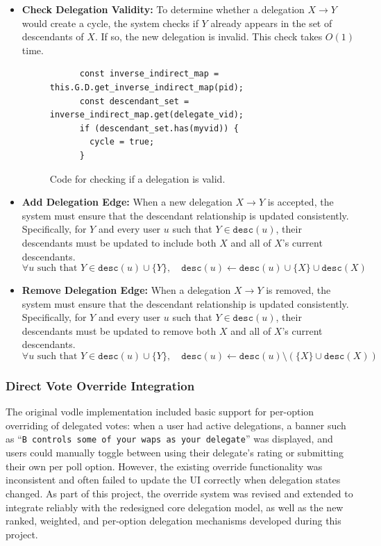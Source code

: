 \begin{itemize}
  \item \textbf{Check Delegation Validity:} To determine whether a delegation \(X \!\to\! Y\) would create a cycle, the system checks if \(Y\) already appears in the set of descendants of \(X\). If so, the new delegation is invalid. This check takes \(O(1)\) time.
  \begin{figure}[H]
    \centering
    \begin{verbatim}
      const inverse_indirect_map = this.G.D.get_inverse_indirect_map(pid);
      const descendant_set = inverse_indirect_map.get(delegate_vid);
      if (descendant_set.has(myvid)) {
        cycle = true;
      }
    \end{verbatim}
    \caption{Code for checking if a delegation is valid.}
  \end{figure}

  \item \textbf{Add Delegation Edge:} When a new delegation \(X \to Y\) is accepted, the system must ensure that the descendant relationship is updated consistently. Specifically, for $Y$ and every user \(u\) such that \(Y \in \texttt{desc}(u)\), their descendants must be updated to include both \(X\) and all of \(X\)'s current descendants.
\[
  \forall u \text{ such that } Y \in \texttt{desc}(u) \cup \{Y\},\quad \texttt{desc}(u) \leftarrow \texttt{desc}(u) \cup \{X\} \cup \texttt{desc}(X)
\]

  \item \textbf{Remove Delegation Edge:} When a delegation \(X \!\to\! Y\) is removed, the system must ensure that the descendant relationship is updated consistently. Specifically, for $Y$ and every user \(u\) such that \(Y \in \texttt{desc}(u)\), their descendants must be updated to remove both \(X\) and all of \(X\)'s current descendants.
\[
  \forall u \text{ such that } Y \in \texttt{desc}(u) \cup \{Y\},\quad \texttt{desc}(u) \leftarrow \texttt{desc}(u) \setminus \left( \{X\} \cup \texttt{desc}(X) \right)
\]
\end{itemize}

\subsubsection{Direct Vote Override Integration}

The original vodle implementation included basic support for per-option overriding of delegated votes: when a user had active delegations, a banner such as ``\texttt{B controls some of your waps as your delegate}'' was displayed, and users could manually toggle between using their delegate's rating or submitting their own per poll option. However, the existing override functionality was inconsistent and often failed to update the UI correctly when delegation states changed. As part of this project, the override system was revised and extended to integrate reliably with the redesigned core delegation model, as well as the new ranked, weighted, and per-option delegation mechanisms developed during this project.

